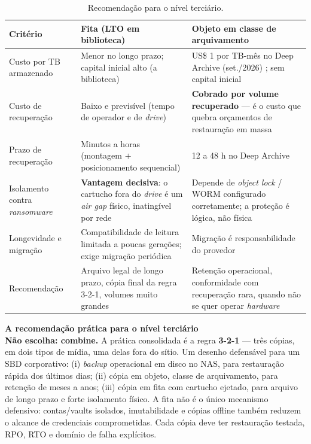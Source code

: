 \documentclass[11pt,a4paper]{article}
\newcommand{\destaque}[2]{%
  \begin{center}\begin{minipage}{0.96\textwidth}
  \colorbox{fundo}{\begin{minipage}{\dimexpr\linewidth-2\fboxsep}
  \vspace{2pt}\textbf{\color{azul}\small #1}\\[1pt]\footnotesize #2\vspace{3pt}
  \end{minipage}}\end{minipage}\end{center}}
\begin{document}
\begin{table}[H]
\centering
\caption{Recomendação para o nível terciário.}
\label{tab:recter}
{\footnotesize
\begin{tabular}{@{}p{4.2cm}p{4.9cm}p{5.4cm}@{}}
\toprule
\textbf{Critério} & \textbf{Fita (LTO em biblioteca)} & \textbf{Objeto em classe de arquivamento} \\
\midrule
Custo por TB armazenado & Menor no longo prazo; capital inicial alto (a biblioteca) & US\$ 1 por
TB-mês no Deep Archive (set./2026) \cite{awsglacier}; sem capital inicial \\
Custo de recuperação & Baixo e previsível (tempo de operador e de \textit{drive}) &
\textbf{Cobrado por volume recuperado} --- é o custo que quebra orçamentos de restauração em massa \\
Prazo de recuperação & Minutos a horas (montagem $+$ posicionamento sequencial) & 12 a 48 h no Deep
Archive \cite{awsglacier} \\
Isolamento contra \textit{ransomware} & \textbf{Vantagem decisiva}: o cartucho fora do \textit{drive}
é um \textit{air gap} físico, inatingível por rede & Depende de \textit{object lock} / WORM
configurado corretamente; a proteção é lógica, não física \\
Longevidade e migração & Compatibilidade de leitura limitada a poucas gerações; exige migração
periódica & Migração é responsabilidade do provedor \\
Recomendação & Arquivo legal de longo prazo, cópia final da regra 3-2-1, volumes muito grandes &
Retenção operacional, conformidade com recuperação rara, quando não se quer operar
\textit{hardware} \\
\bottomrule
\end{tabular}}
\end{table}

\destaque{A recomendação prática para o nível terciário}{%
\textbf{Não escolha: combine.} A prática consolidada é a regra \textbf{3-2-1} --- três cópias, em
dois tipos de mídia, uma delas fora do sítio. Um desenho defensável para um SBD corporativo:
(i) \textit{backup} operacional em disco no NAS, para restauração rápida dos últimos dias;
(ii) cópia em objeto, classe de arquivamento, para retenção de meses a anos; (iii) cópia em fita
com cartucho ejetado, para arquivo de longo prazo e forte isolamento físico. A fita não é o
único mecanismo defensivo: contas/vaults isolados, imutabilidade e cópias offline também
reduzem o alcance de credenciais comprometidas. Cada cópia deve ter restauração testada,
RPO, RTO e domínio de falha explícitos.}
\end{document}
